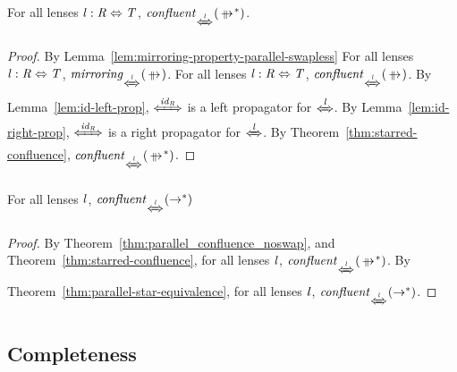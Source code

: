 \documentclass[numbers,10pt,preprint\ifanon ,nocopyrightspace\fi]{sigplanconf}
\begin{document}
\begin{lemma}
  \label{thm:star_parallel_confluence}
  For all lenses $\mathit{l} : \mathit{R} \Leftrightarrow \mathit{T}$,
  $\IsConfluentWithPropertyOf{\StarOf{\ParallelRewrite}}{\DNFLensHasSemanticsOf{\Lens}}$.
\end{lemma}
\begin{proof}
  By Lemma~\ref{lem:mirroring-property-parallel-swapless}
  For all lenses $\mathit{l} : \mathit{R} \Leftrightarrow \mathit{T}$,
  $\IsMirroringWithPropertyOf{\ParallelRewrite}{\DNFLensHasSemanticsOf{\Lens}}$.
  For all lenses $\mathit{l} : \mathit{R} \Leftrightarrow \mathit{T}$,
  $\IsConfluentWithPropertyOf{\ParallelRewrite}{\DNFLensHasSemanticsOf{\Lens}}$.
  By Lemma~\ref{lem:id-left-prop},
  $\DNFLensHasSemanticsOf{\IdentityLensOf{\Regex}}$ is a left propagator for
  $\DNFLensHasSemanticsOf{\Lens}$.
  By Lemma~\ref{lem:id-right-prop},
  $\DNFLensHasSemanticsOf{\IdentityLensOf{\Regex}}$ is a right propagator for
  $\DNFLensHasSemanticsOf{\Lens}$.
  By Theorem~\ref{thm:starred-confluence},
  $\IsConfluentWithPropertyOf{\StarOf{\ParallelRewrite}}{\DNFLensHasSemanticsOf{\Lens}}$.
\end{proof}

\begin{corollary}
  \label{cor:rewrite-confluence}
  For all lenses $\mathit{l}$,
  $\IsConfluentWithPropertyOf{\StarOf{\Rewrite}}{\DNFLensHasSemanticsOf{\Lens}}$
\end{corollary}
\begin{proof}
  By Theorem~\ref{thm:parallel_confluence_noswap}, and
  Theorem~\ref{thm:starred-confluence},
  for all lenses $\mathit{l}$,
  $\IsConfluentWithPropertyOf
  {\StarOf{\ParallelRewrite}}{\DNFLensHasSemanticsOf{\Lens}}$.
  By Theorem~\ref{thm:parallel-star-equivalence},
  for all lenses $\mathit{l}$,
  $\IsConfluentWithPropertyOf
  {\StarOf{\Rewrite}}{\DNFLensHasSemanticsOf{\Lens}}$.
\end{proof}

\subsection{Completeness}
\end{document}
